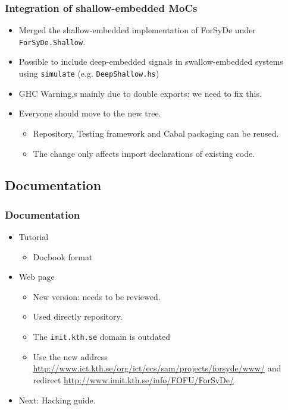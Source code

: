 \documentclass{beamer}
\begin{document}
\begin{frame}
  \frametitle{Integration of shallow-embedded MoCs}
  \begin{itemize}
  \item Merged the shallow-embedded implementation of ForSyDe under
    \texttt{ForSyDe.Shallow}.
  \item Possible to include deep-embedded signals in swallow-embedded
    systems using \texttt{simulate} (e.g. \texttt{DeepShallow.hs})
  \item GHC Warning,s mainly due to double exports: we need to fix this.
  \item Everyone should move to the new tree.
    \begin{itemize}
    \item Repository, Testing framework and Cabal packaging can be
      reused.
    \item The change only affects import declarations of existing code.
    \end{itemize}
  \end{itemize}
  
\end{frame}

\subsection{Documentation}

\begin{frame}
  \frametitle{Documentation}
  \begin{itemize}
  \item Tutorial
    \begin{itemize}
      \item Docbook format
    \end{itemize}
  \item Web page
  \begin{itemize}
    \item New version: needs to be reviewed.
    \item Used directly repository.
    \item The \texttt{imit.kth.se} domain is outdated
    \item Use the new address
      \url{http://www.ict.kth.se/org/ict/ecs/sam/projects/forsyde/www/}
      and redirect \url{http://www.imit.kth.se/info/FOFU/ForSyDe/}
  \end{itemize}
  \item Next: Hacking guide.
  \end{itemize}
  
\end{frame}
\end{document}
